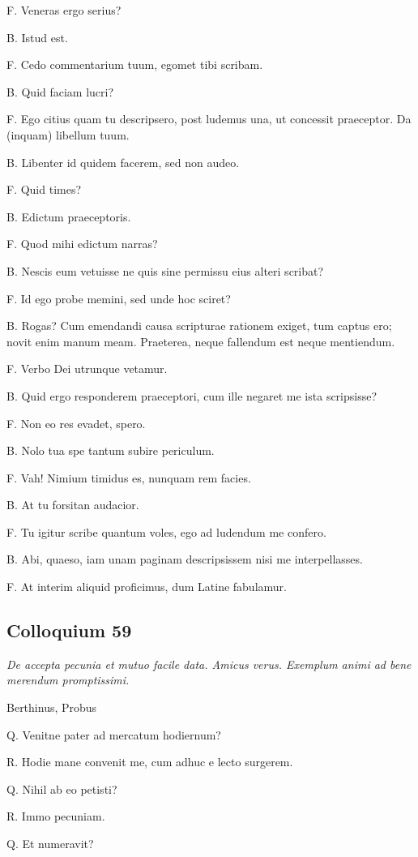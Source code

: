 \documentclass{article}
\begin{document}
F. Veneras ergo serius?

B. Istud est. 

F. Cedo commentarium tuum, egomet tibi scribam. 

B. Quid faciam lucri?

F. Ego citius quam tu descripsero, post ludemus una, ut concessit praeceptor. Da (inquam) libellum tuum. 

B. Libenter id quidem facerem, sed non audeo. 

F. Quid times?

B. Edictum praeceptoris. 

F. Quod mihi edictum narras?

B. Nescis eum vetuisse ne quis sine permissu eius alteri scribat?

F. Id ego probe memini, sed unde hoc sciret?

B. Rogas? Cum emendandi causa scripturae rationem exiget, tum captus ero; novit enim manum meam. Praeterea, neque fallendum est neque mentiendum. 

F. Verbo Dei utrunque vetamur. 

B. Quid ergo responderem praeceptori, cum ille negaret me ista scripsisse?

F. Non eo res evadet, spero. 

B. Nolo tua spe tantum subire periculum. 

F. Vah! Nimium timidus es, nunquam rem facies. 

B. At tu forsitan audacior. 

F. Tu igitur scribe quantum voles, ego ad ludendum me confero. 

B. Abi, quaeso, iam unam paginam descripsissem nisi me interpellasses. 

F. At interim aliquid proficimus, dum Latine fabulamur. 

\subsection{Colloquium 59}
\emph{De accepta pecunia et mutuo facile data. Amicus verus. Exemplum animi ad bene merendum promptissimi.}

Berthinus, Probus

Q. Venitne pater ad mercatum hodiernum?

R. Hodie mane convenit me, cum adhuc e lecto surgerem. 

Q. Nihil ab eo petisti?

R. Immo pecuniam. 

Q. Et numeravit?
\end{document}
